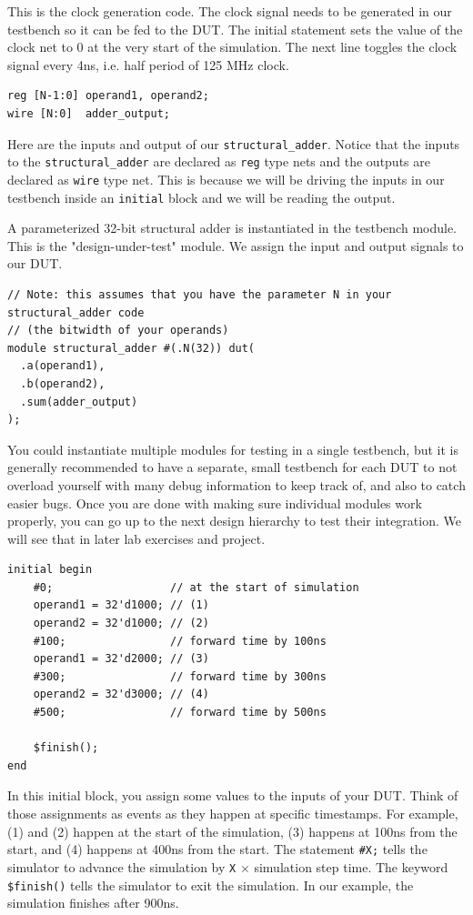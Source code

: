 \documentclass[11pt]{article}
\begin{document}
This is the clock generation code.
The clock signal needs to be generated in our testbench so it can be fed to the DUT.
The initial statement sets the value of the clock net to 0 at the very start of the simulation.
The next line toggles the clock signal every 4ns, i.e. half period of 125 MHz clock.

\begin{verbatim}
reg [N-1:0] operand1, operand2;
wire [N:0]  adder_output;
\end{verbatim}

Here are the inputs and output of our \verb|structural_adder|.
Notice that the inputs to the \verb|structural_adder| are declared as \verb|reg| type nets and the outputs are declared as \verb|wire| type net.
This is because we will be driving the inputs in our testbench inside an \verb|initial| block and we will be reading the output.

A parameterized 32-bit structural adder is instantiated in the testbench module. This is the "design-under-test" module. We assign the input and output signals to our DUT.

\begin{verbatim}
// Note: this assumes that you have the parameter N in your structural_adder code
// (the bitwidth of your operands)
module structural_adder #(.N(32)) dut(
  .a(operand1),
  .b(operand2),
  .sum(adder_output)
);
\end{verbatim}

You could instantiate multiple modules for testing in a single testbench, but it is generally recommended to have a separate, small testbench for each DUT to not overload yourself with many debug information to keep track of, and also to catch easier bugs. Once you are done with making sure individual modules work properly, you can go up to the next design hierarchy to test their integration. We will see that in later lab exercises and project.

\begin{verbatim}
initial begin
    #0;                  // at the start of simulation
    operand1 = 32'd1000; // (1)
    operand2 = 32'd1000; // (2)
    #100;                // forward time by 100ns
    operand1 = 32'd2000; // (3)
    #300;                // forward time by 300ns
    operand2 = 32'd3000; // (4)
    #500;                // forward time by 500ns

    $finish();
end
\end{verbatim}

In this initial block, you assign some values to the inputs of your DUT. Think of those assignments as events as they happen at specific timestamps. For example, (1) and (2) happen at the start of the simulation, (3) happens at 100ns from the start, and (4) happens at 400ns from the start. The statement \verb|#X;| tells the simulator to advance the simulation by \verb|X| $\times$ simulation step time. The keyword \verb|$finish()| tells the simulator to exit the simulation. In our example, the simulation finishes after 900ns.
\end{document}
